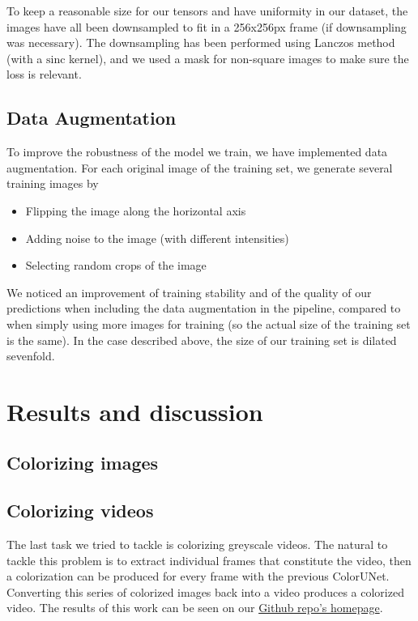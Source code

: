 \documentclass[10pt,twocolumn,letterpaper]{article}
\begin{document}
To keep a reasonable size for our tensors and have uniformity in our dataset, the images have all been downsampled to fit in a 256x256px frame (if downsampling was necessary). The downsampling has been performed using Lanczos method (with a $\text{sinc}$ kernel), and we used a mask for non-square images to make sure the loss is relevant.

\subsection{Data Augmentation}

To improve the robustness of the model we train, we have implemented data augmentation. For each original image of the training set, we generate several training images by
\begin{itemize}
\item Flipping the image along the horizontal axis
\item Adding noise to the image (with different intensities)
\item Selecting random crops of the image
\end{itemize}

We noticed an improvement of training stability and of the quality of our predictions when including the data augmentation in the pipeline, compared to when simply using more images for training (so the actual size of the training set is the same). In the case described above, the size of our training set is dilated sevenfold.

\section{Results and discussion}
\subsection{Colorizing images}

\subsection{Colorizing videos}

The last task we tried to tackle is colorizing greyscale videos. The natural to tackle this problem is to extract individual frames that constitute the video, then a colorization can be produced for every frame with the previous ColorUNet. Converting this series of colorized images back into a video produces a colorized video. The results of this work can be seen on our \href{https://github.com/vincentbillaut/all-colors-matter}{Github repo's homepage}.
\end{document}
